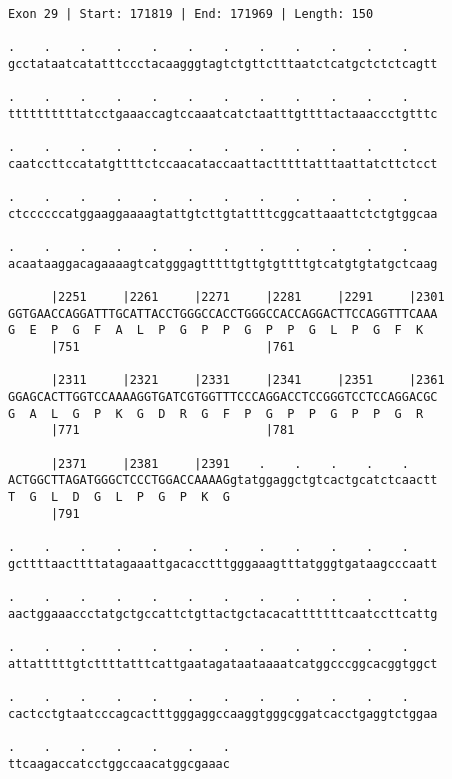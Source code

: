 \documentclass{article}
\begin{document}
\begin{Verbatim}
Exon 29 | Start: 171819 | End: 171969 | Length: 150
 
.    .    .    .    .    .    .    .    .    .    .    .    
gcctataatcatatttccctacaagggtagtctgttctttaatctcatgctctctcagtt
  
.    .    .    .    .    .    .    .    .    .    .    .    
ttttttttttatcctgaaaccagtccaaatcatctaatttgttttactaaaccctgtttc
  
.    .    .    .    .    .    .    .    .    .    .    .    
caatccttccatatgttttctccaacataccaattactttttatttaattatcttctcct
  
.    .    .    .    .    .    .    .    .    .    .    .    
ctccccccatggaaggaaaagtattgtcttgtattttcggcattaaattctctgtggcaa
  
.    .    .    .    .    .    .    .    .    .    .    .    
acaataaggacagaaaagtcatgggagtttttgttgtgttttgtcatgtgtatgctcaag
  
      |2251     |2261     |2271     |2281     |2291     |2301
GGTGAACCAGGATTTGCATTACCTGGGCCACCTGGGCCACCAGGACTTCCAGGTTTCAAA
G  E  P  G  F  A  L  P  G  P  P  G  P  P  G  L  P  G  F  K  
      |751                          |761                    
  
      |2311     |2321     |2331     |2341     |2351     |2361
GGAGCACTTGGTCCAAAAGGTGATCGTGGTTTCCCAGGACCTCCGGGTCCTCCAGGACGC
G  A  L  G  P  K  G  D  R  G  F  P  G  P  P  G  P  P  G  R  
      |771                          |781                    
  
      |2371     |2381     |2391    .    .    .    .    .    
ACTGGCTTAGATGGGCTCCCTGGACCAAAAGgtatggaggctgtcactgcatctcaactt
T  G  L  D  G  L  P  G  P  K  G                             
      |791                                                  
  
.    .    .    .    .    .    .    .    .    .    .    .    
gcttttaacttttatagaaattgacacctttgggaaagtttatgggtgataagcccaatt
  
.    .    .    .    .    .    .    .    .    .    .    .    
aactggaaaccctatgctgccattctgttactgctacacatttttttcaatccttcattg
  
.    .    .    .    .    .    .    .    .    .    .    .    
attatttttgtcttttatttcattgaatagataataaaatcatggcccggcacggtggct
  
.    .    .    .    .    .    .    .    .    .    .    .    
cactcctgtaatcccagcactttgggaggccaaggtgggcggatcacctgaggtctggaa
  
.    .    .    .    .    .    .
ttcaagaccatcctggccaacatggcgaaac
\end{Verbatim}
\end{document}
